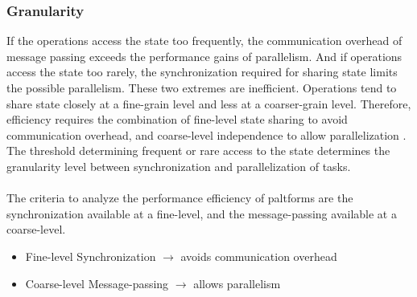 \subsubsection{Granularity} \label{chapter3:definitions:efficiency:granularity}

If the operations access the state too frequently, the communication overhead of message passing exceeds the performance gains of parallelism.
And if operations access the state too rarely, the synchronization required for sharing state limits the possible parallelism.
These two extremes are inefficient.
Operations tend to share state closely at a fine-grain level and less at a coarser-grain level.
Therefore, efficiency requires the combination of fine-level state sharing to avoid communication overhead, and coarse-level independence to allow parallelization \cite{Gustafson1988,Gunther1996,Nelson1996,Gunther2002}.
The threshold determining frequent or rare access to the state determines the granularity level between synchronization and parallelization of tasks.

\paragraph{}


The criteria to analyze the performance efficiency of paltforms are the synchronization available at a fine-level, and the message-passing available at a coarse-level.

\begin{itemize}
\item Fine-level Synchronization
  \subitem $\to$ avoids communication overhead
\item Coarse-level Message-passing
  \subitem $\to$ allows parallelism
\end{itemize}


